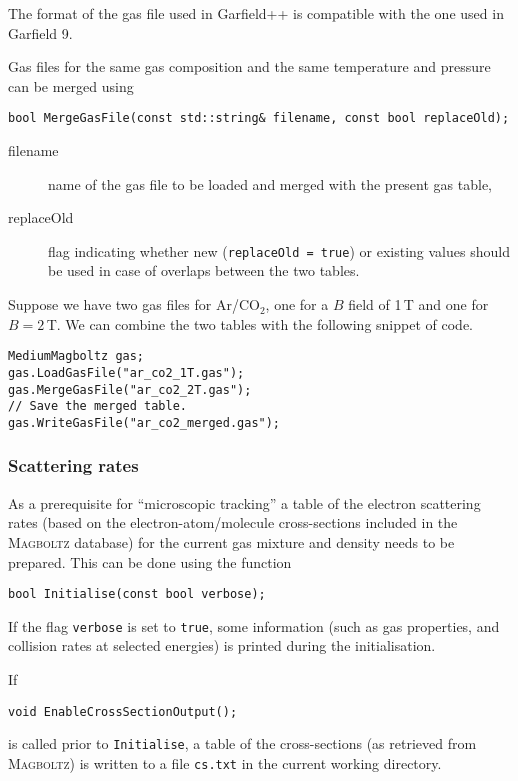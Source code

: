 The format of the gas file used in Garfield++ is compatible with the 
one used in Garfield 9. 

Gas files for the same gas composition and the same temperature and pressure
can be merged using
\begin{lstlisting}
bool MergeGasFile(const std::string& filename, const bool replaceOld);
\end{lstlisting}
\begin{description}
  \item[filename] name of the gas file to be loaded and merged with the 
present gas table,
  \item[replaceOld] flag indicating whether new (\texttt{replaceOld = true}) or existing values should be used in case of overlaps between the 
two tables. 
\end{description}
Suppose we have two gas files for Ar/CO$_{2}$, one for a $B$ field of 1\,T
and one for $B = 2$\,T. We can combine the two tables 
with the following snippet of code.
\begin{lstlisting}
MediumMagboltz gas;
gas.LoadGasFile("ar_co2_1T.gas");
gas.MergeGasFile("ar_co2_2T.gas");
// Save the merged table.
gas.WriteGasFile("ar_co2_merged.gas");
\end{lstlisting} 

\subsubsection{Scattering rates}

As a prerequisite for ``microscopic tracking'' a 
table of the electron scattering rates 
(based on the electron-atom/molecule cross-sections included in the 
\textsc{Magboltz} database) for the 
current gas mixture and density needs to be prepared. 
This can be done using the function 
\begin{lstlisting}
bool Initialise(const bool verbose);
\end{lstlisting}
If the flag \texttt{verbose} is set to \texttt{true}, 
some information (such as gas properties, and collision rates at selected 
energies) is printed during the initialisation.  

If 
\begin{lstlisting}
void EnableCrossSectionOutput();
\end{lstlisting}
is called prior to \texttt{Initialise}, a table of the cross-sections 
(as retrieved from \textsc{Magboltz}) is written to a file \texttt{cs.txt} 
in the current working directory. 

